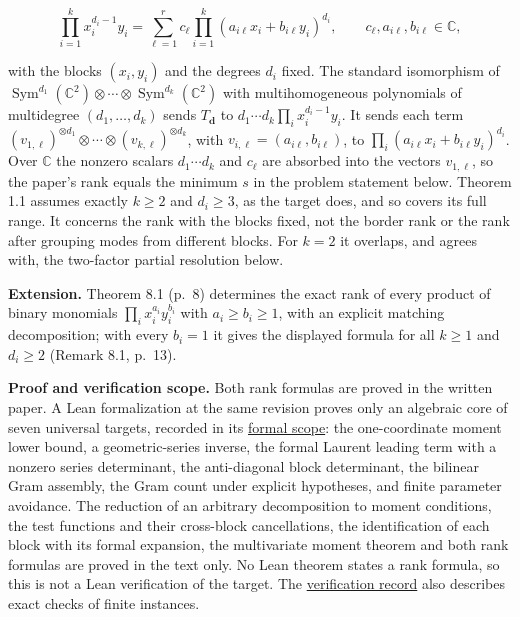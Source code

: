 \documentclass[11pt,a4paper]{article}
\begin{document}
\[\prod_{i=1}^k x_i^{d_i-1}y_i=\sum_{\ell=1}^{r}c_\ell\prod_{i=1}^k(a_{i\ell}x_i+b_{i\ell}y_i)^{d_i},
\qquad c_\ell,a_{i\ell},b_{i\ell}\in\mathbb C,\]

with the blocks \((x_i,y_i)\) and the degrees \(d_i\) fixed. The
standard isomorphism of
\(\mathop{\mathrm{Sym}}\nolimits^{d_1}(\mathbb C^2)\otimes\cdots\otimes\mathop{\mathrm{Sym}}\nolimits^{d_k}(\mathbb C^2)\)
with multihomogeneous polynomials of multidegree \((d_1,\ldots,d_k)\)
sends \(T_{\mathbf d}\) to \(d_1\cdots d_k\prod_i x_i^{d_i-1}y_i\). It
sends each term
\((v_{1,\ell})^{\otimes d_1}\otimes\cdots\otimes(v_{k,\ell})^{\otimes d_k}\),
with \(v_{i,\ell}=(a_{i\ell},b_{i\ell})\), to
\(\prod_i(a_{i\ell}x_i+b_{i\ell}y_i)^{d_i}\). Over \(\mathbb C\) the
nonzero scalars \(d_1\cdots d_k\) and \(c_\ell\) are absorbed into the
vectors \(v_{1,\ell}\), so the paper's rank equals the minimum \(s\) in
the problem statement below. Theorem 1.1 assumes exactly \(k\ge2\) and
\(d_i\ge3\), as the target does, and so covers its full range. It
concerns the rank with the blocks fixed, not the border rank or the rank
after grouping modes from different blocks. For \(k=2\) it overlaps, and
agrees with, the two-factor partial resolution below.

\textbf{Extension.} Theorem 8.1 (p.~8) determines the exact rank of
every product of binary monomials \(\prod_i x_i^{a_i}y_i^{b_i}\) with
\(a_i\ge b_i\ge1\), with an explicit matching decomposition; with every
\(b_i=1\) it gives the displayed formula for all \(k\ge1\) and
\(d_i\ge2\) (Remark 8.1, p.~13).

\textbf{Proof and verification scope.} Both rank formulas are proved in
the written paper. A Lean formalization at the same revision proves only
an algebraic core of seven universal targets, recorded in its
\href{https://github.com/erenup/w-tensor-product-rank/blob/b60a62dd7fc4595fa82dafdd56649e462440b38f/lean/SCOPE.md}{formal
scope}: the one-coordinate moment lower bound, a geometric-series
inverse, the formal Laurent leading term with a nonzero series
determinant, the anti-diagonal block determinant, the bilinear Gram
assembly, the Gram count under explicit hypotheses, and finite parameter
avoidance. The reduction of an arbitrary decomposition to moment
conditions, the test functions and their cross-block cancellations, the
identification of each block with its formal expansion, the multivariate
moment theorem and both rank formulas are proved in the text only. No
Lean theorem states a rank formula, so this is not a Lean verification
of the target. The
\href{https://github.com/erenup/w-tensor-product-rank/blob/b60a62dd7fc4595fa82dafdd56649e462440b38f/VERIFICATION.md}{verification
record} also describes exact checks of finite instances.
\end{document}
